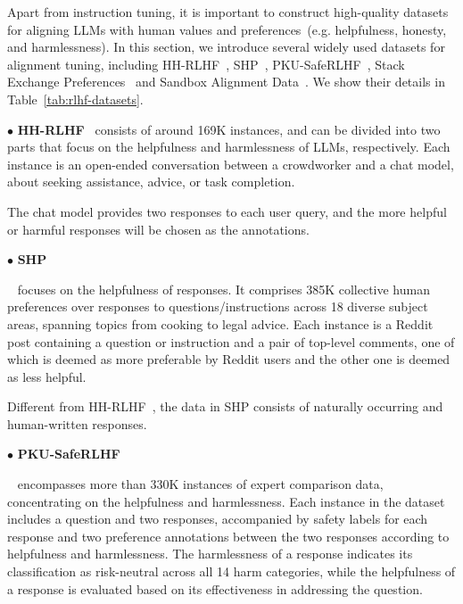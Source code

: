 Apart from instruction tuning, it is important to construct high-quality datasets for aligning LLMs with   human values and preferences~(e.g. helpfulness, honesty, and harmlessness). In this section, we introduce several widely used datasets for alignment tuning, including  HH-RLHF~\cite{Bai-arxiv-2022-Training}, SHP~\cite{Ethayarajh-ICLM-2022-Understanding}, PKU-SafeRLHF~\cite{Dai-arxiv-2023-SafeRLHF}, Stack Exchange Preferences~\cite{Lambert-2023-StackH4} and Sandbox Alignment Data~\cite{Liu-arxiv-2023-training}. We show their details in Table~\ref{tab:rlhf-datasets}.

$\bullet$  \textbf{HH-RLHF}~\cite{Bai-arxiv-2022-Training} consists of around 169K instances, and can be divided into two parts that focus on the helpfulness and harmlessness of LLMs, respectively. Each instance is an open-ended conversation between a crowdworker and a chat model, about seeking assistance, advice, or task completion.

The chat model provides two responses  to each user query, and the more helpful or harmful responses will be chosen as the annotations.

$\bullet$  {\textbf{SHP}}{~\cite{Ethayarajh-ICLM-2022-Understanding} focuses on the helpfulness of responses. It comprises 385K collective human preferences over responses to questions/instructions across 18 diverse subject areas, spanning topics from cooking to legal advice. Each instance is a Reddit post containing a question or instruction and a pair of top-level comments, one of which is deemed as more preferable by Reddit users and the other one is deemed as less helpful. 

Different from HH-RLHF~\cite{Bai-arxiv-2022-Training}, the data in SHP consists of naturally occurring and human-written responses.

 }

$\bullet$  {\textbf{PKU-SafeRLHF}}{~\cite{Dai-arxiv-2023-SafeRLHF} encompasses more than 330K instances of expert comparison data, concentrating on the helpfulness and harmlessness. Each instance in the dataset includes a question and two responses, accompanied by safety labels for each response and two preference annotations between the two responses according to helpfulness and harmlessness. The harmlessness of a response indicates its classification as risk-neutral across all 14 harm categories, while the helpfulness of a response is evaluated based on its effectiveness in addressing the question. 

 }


